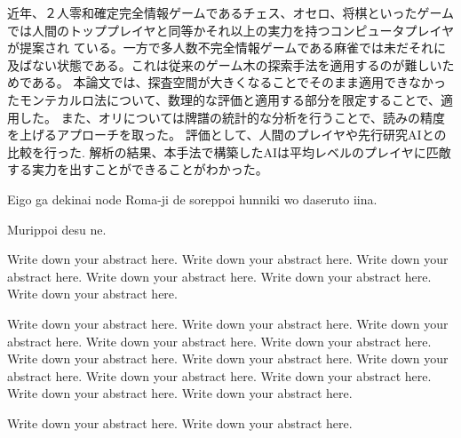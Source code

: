 
\begin{jabstract}

近年、２人零和確定完全情報ゲームであるチェス、オセロ、将棋といったゲームでは人間のトッププレイヤと同等かそれ以上の実力を持つコンピュータプレイヤが提案され
ている。一方で多人数不完全情報ゲームである麻雀では未だそれに及ばない状態である。これは従来のゲーム木の探索手法を適用するのが難しいためである。
本論文では、探査空間が大きくなることでそのまま適用できなかったモンテカルロ法について、数理的な評価と適用する部分を限定することで、適用した。
また、オリについては牌譜の統計的な分析を行うことで、読みの精度を上げるアプローチを取った。
評価として、人間のプレイヤや先行研究AIとの比較を行った. 
解析の結果、本手法で構築したAIは平均レベルのプレイヤに匹敵する実力を出すことができることがわかった。


\end{jabstract}


\begin{eabstract}

Eigo ga dekinai node Roma-ji de soreppoi hunniki wo daseruto iina.

Murippoi desu ne.

Write down your abstract here. Write down your abstract here. Write down your abstract here. Write down your abstract here. Write down your abstract here. Write down your abstract here.

 Write down your abstract here. Write down your abstract here. Write down your abstract here. Write down your abstract here. Write down your abstract here. Write down your abstract here. Write down your abstract here. Write down your abstract here. Write down your abstract here. Write down your abstract here. Write down your abstract here. Write down your abstract here.

Write down your abstract here. Write down your abstract here.

\end{eabstract}
